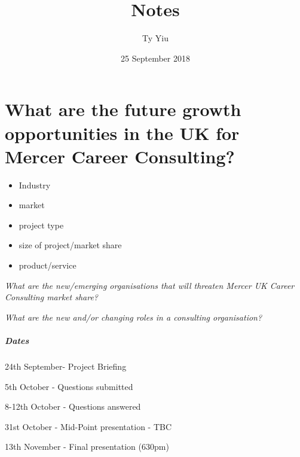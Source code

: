 \documentclass{article}
\author{Ty Yiu}                                 %
\title{Notes}                           %
\date{25 September 2018}
\begin{document}
\maketitle                                        %


\section{
What are the future growth opportunities in the UK for Mercer Career Consulting? 
}

\begin{itemize}
\item Industry
\item market
\item project type
\item size of project/market share
\item product/service
\end{itemize}
 
\textit{What are the new/emerging organisations that will threaten Mercer UK Career Consulting market share?}

\textit{What are the new and/or changing roles in a consulting organisation?}

\subparagraph{Dates}
24th September- Project Briefing

5th October - Questions submitted

8-12th October - Questions answered

31st October - Mid-Point presentation - TBC

13th November - Final presentation (630pm)
\end{document}
